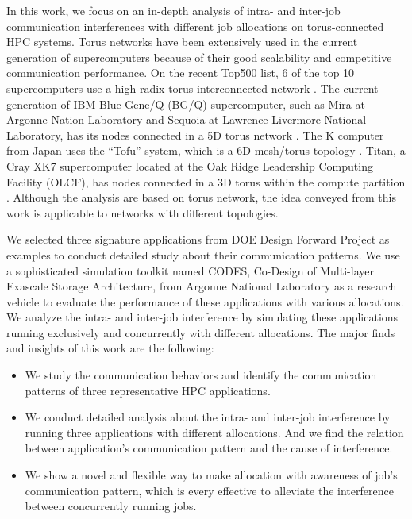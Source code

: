 \documentclass[conference]{IEEEtran}
\begin{document}
In this work, we focus on an in-depth analysis of intra- and inter-job communication interferences with  different job allocations on torus-connected HPC systems. Torus networks have been extensively used in the current generation of supercomputers because of their good scalability and competitive communication performance. On the recent Top500 list, 6 of the top 10 supercomputers use a high-radix torus-interconnected network \cite{top500}. The current generation of IBM Blue Gene/Q (BG/Q) supercomputer, such as Mira at Argonne Nation Laboratory and Sequoia at  Lawrence Livermore National Laboratory, has its nodes connected in a 5D torus network \cite{bgq}. The K computer from Japan uses the ``Tofu” system, which is a 6D mesh/torus topology \cite{tofu}. Titan, a Cray XK7 supercomputer located at the Oak Ridge Leadership Computing Facility (OLCF), has nodes connected in a 3D torus within the compute partition \cite{titan}. Although the analysis are based on torus network, the idea conveyed from this work is applicable to networks with different topologies. 

We selected three signature applications from DOE Design Forward Project\cite{designforwardwebpage} as examples to conduct detailed study about their communication patterns. We use a sophisticated simulation toolkit named CODES, Co-Design of Multi-layer Exascale Storage Architecture\cite{Jason-2011}, from Argonne National Laboratory as a research vehicle to evaluate the performance of these applications with various allocations. We analyze the intra- and inter-job interference by simulating these applications running exclusively and concurrently with different allocations. The major finds and insights of this work are the following:

\begin{itemize}
    \item We study the communication behaviors and identify the communication patterns of three representative HPC applications.
    \item We conduct detailed analysis about the intra- and inter-job interference by running three applications with different allocations. And we find the relation between application's communication pattern and the cause of interference.
    \item We show a novel and flexible way to make allocation with awareness of job's communication pattern, which  is every effective to alleviate the interference between concurrently running jobs. 
\end{itemize}
\end{document}
